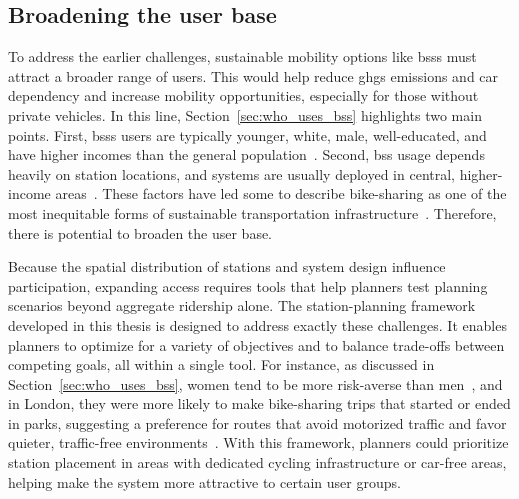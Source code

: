 \subsection{Broadening the user base}

To address the earlier challenges, sustainable mobility options like \acp{bss} must attract a broader range of users. This would help reduce \acp{ghg} emissions and car dependency and increase mobility opportunities, especially for those without private vehicles. In this line, Section~\ref{sec:who_uses_bss} highlights two main points. First, \acp{bss} users are typically younger, white, male, well-educated, and have higher incomes than the general population~\cite{Murphy2015, BachandMarleau2012, Goodman2014, Shaheen2014, Fishman2013, Fishman2014, Bauman2017, Ogilvie2012, Steinbach2011, Willberg2021, Waldner2025}. Second, \ac{bss} usage depends heavily on station locations, and systems are usually deployed in central, higher-income areas~\cite{Ogilvie2012, Goodman2014, Willberg2021}. These factors have led some to describe bike-sharing as one of the most inequitable forms of sustainable transportation infrastructure~\cite{Hoffmann2016}. Therefore, there is potential to broaden the user base.

Because the spatial distribution of stations and system design influence participation, expanding access requires tools that help planners test planning scenarios beyond aggregate ridership alone. The station-planning framework developed in this thesis is designed to address exactly these challenges. It enables planners to optimize for a variety of objectives and to balance trade-offs between competing goals, all within a single tool. For instance, as discussed in Section~\ref{sec:who_uses_bss}, women tend to be more risk-averse than men~\cite{Garrard2008, Garrard2012}, and in London, they were more likely to make bike-sharing trips that started or ended in parks, suggesting a preference for routes that avoid motorized traffic and favor quieter, traffic-free environments~\cite{Goodman2014, Johnson2010}. With this framework, planners could prioritize station placement in areas with dedicated cycling infrastructure or car-free areas, helping make the system more attractive to certain user groups.

